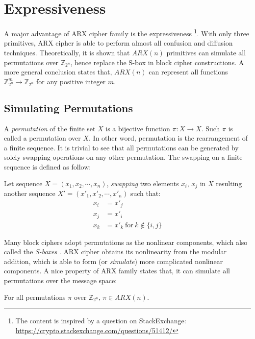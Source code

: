 \section{Expressiveness}
\label{sec:expressiveness}

A major advantage of ARX cipher family is the expressiveness
\footnote{The content is inspired by a question on StackExchange:
\url{https://crypto.stackexchange.com/questions/51412/}}.
With only three primitives, ARX cipher is able to perform almost all confusion and
diffusion techniques. Theoretically, it is shown that $\textit{ARX}(n)$ primitives
can simulate all permutations over $\mathbb{Z}_{2^n}$, hence replace the S-box in
block cipher constructions. A more general conclusion states that, $\textit{ARX}(n)$
can represent all functions $\mathbb{Z}_{2^n}^m\rightarrow\mathbb{Z}_{2^n}$ for any
positive integer $m$.

\subsection{Simulating Permutations}

A \textit{permutation} of the finite set $X$ is a bijective function $\pi:\textit{X}\rightarrow X$.
Such $\pi$ is called a permutation over $X$. In other word, permutation is the
rearrangement of a finite sequence. It is trivial to see that all permutations can be
generated by solely swapping operations on any other permutation. The swapping on a
finite sequence is defined as follow:

\begin{definition}
Let sequence $X=(x_1,x_2,\cdots,x_n)$, \textit{swapping} two elements $x_i$, $x_j$ in
$X$ resulting another sequence $X'=(x'_1,x'_2,\cdots,x'_n)$ such that:
\begin{align*}
x_i &= x'_j \\
x_j &= x'_i \\
x_k &= x'_k\ \mathrm{for}\ k\notin\{i,j\}
\end{align*}
\end{definition}

Many block ciphers adopt permutations as the nonlinear components, which also called
the \textit{S-boxes} \cite{stinson2005cryptography}. ARX cipher obtains its nonlinearity
from the modular addition, which is able to form (or \textit{simulate}) more complicated
nonlinear components. A nice property of ARX family states that, it can simulate all
permutations over the message space:

\begin{theorem}
\label{thm:perm}
For all permutations $\pi$ over $\mathbb{Z}_{2^n}$, $\pi\in\textit{ARX}(n)$.
\end{theorem}

